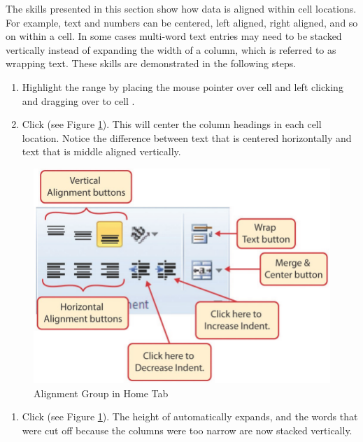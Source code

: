 The skills presented in this section show how data is aligned within cell locations. For example, text and numbers can be centered, left aligned, right aligned, and so on within a cell. In some cases multi-word text entries may need to be stacked vertically instead of expanding the width of a column, which is referred to as wrapping text. These skills are demonstrated in the following steps.

\begin{enumerate}
	\item Highlight the range  by placing the mouse pointer over cell  and left clicking and dragging over to cell .
	\item Click  (see Figure \ref{01:fig38}). This will center the column headings in each cell location. Notice the difference between text that is centered horizontally and text that is middle aligned vertically.
\end{enumerate}

\begin{figure}[H]
	\centering
	\includegraphics[width=\maxwidth{.95\linewidth}]{gfx/ch01_fig38}
	\caption{Alignment Group in Home Tab}
	\label{01:fig38}
\end{figure}

\begin{enumerate}[resume]
	\item Click  (see Figure \ref{01:fig38}). The height of  automatically expands, and the words that were cut off because the columns were too narrow are now stacked vertically.
\end{enumerate}

